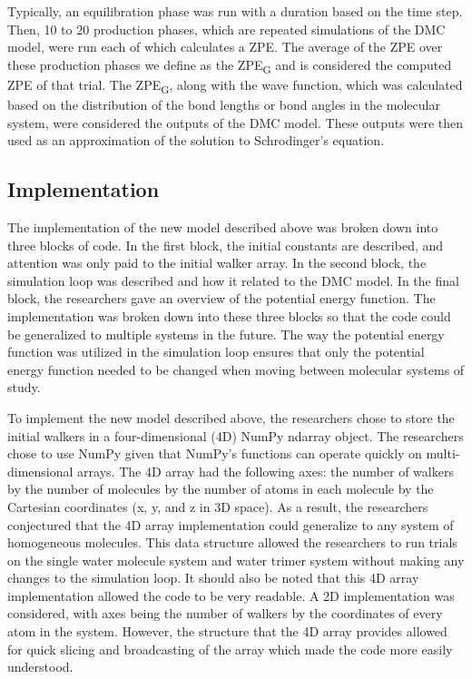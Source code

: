 \documentclass[journal=jacsat,manuscript=article]{achemso}
\begin{document}
Typically, an equilibration phase was run with a duration based on the time step. Then, 10 to 20 production phases, which are repeated simulations of the DMC model, were run each of which calculates a ZPE. The average of the ZPE over these production phases we define as the ZPE\textsubscript{G} and is considered the computed ZPE of that trial. The ZPE\textsubscript{G}, along with the wave function, which was calculated based on the distribution of the bond lengths or bond angles in the molecular system, were considered the outputs of the DMC model. These outputs were then used as an approximation of the solution to Schrodinger’s equation.

\subsection{Implementation}

The implementation of the new model described above was broken down into three blocks of code. In the first block, the initial constants are described, and attention was only paid to the initial walker array. In the second block, the simulation loop was described and how it related to the DMC model. In the final block, the researchers gave an overview of the potential energy function. The implementation was broken down into these three blocks so that the code could be generalized to multiple systems in the future. The way the potential energy function was utilized in the simulation loop ensures that only the potential energy function needed to be changed when moving between molecular systems of study. 

To implement the new model described above, the researchers chose to store the initial walkers in a four-dimensional (4D) NumPy ndarray object. The researchers chose to use NumPy given that NumPy’s functions can operate quickly on multi-dimensional arrays. The 4D array had the following axes: the number of walkers by the number of molecules by the number of atoms in each molecule by the Cartesian coordinates (x, y, and z in 3D space). As a result, the researchers conjectured that the 4D array implementation could generalize to any system of homogeneous molecules. This data structure allowed the researchers to run trials on the single water molecule system and water trimer system without making any changes to the simulation loop. It should also be noted that this 4D array implementation allowed the code to be very readable. A 2D implementation was considered, with axes being the number of walkers by the coordinates of every atom in the system. However, the structure that the 4D array provides allowed for quick slicing and broadcasting of the array which made the code more easily understood.
\end{document}

